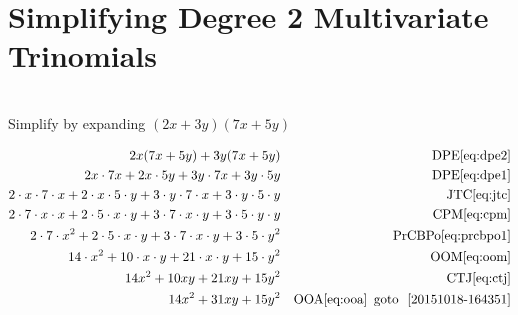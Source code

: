 \documentclass[20150903-160354-rs2.2-MarksMathNotebook.tex]{subfiles}
\begin{document}

\section{Simplifying Degree 2 Multivariate Trinomials}\label{Simplify! Degree 2 Multivariate Trinomials}

\begin{example}[id:20151018-161544] \label{20151018-161544} \hfill \\
Simplify by expanding $(2x+3y)(7x+5y)$

\soln

\solnsteps
\begin{align*}
2x(7x+5y) + 3y(7x+5y) && \text{DPE} \eqref{eq:dpe2} \\
2x \cdot 7x + 2x \cdot 5y + 3y \cdot 7x + 3y \cdot 5y && \text{DPE} \eqref{eq:dpe1} \\
2 \cdot x \cdot 7 \cdot x +  2 \cdot x \cdot 5 \cdot y + 3 \cdot y \cdot 7 \cdot x + 3 \cdot y \cdot 5 \cdot y && \text{JTC} \eqref{eq:jtc} \\
2 \cdot 7 \cdot x \cdot x +  2 \cdot 5 \cdot x \cdot y + 3 \cdot 7 \cdot x \cdot y + 3 \cdot 5 \cdot y \cdot y && \text{CPM} \eqref{eq:cpm} \\
2 \cdot 7 \cdot x^2 +  2 \cdot 5 \cdot x \cdot y + 3 \cdot 7 \cdot x \cdot y + 3 \cdot 5 \cdot y^2 && \text{PrCBPo} \eqref{eq:prcbpo1} \\
14 \cdot x^2 +  10 \cdot x \cdot y + 21 \cdot x \cdot y + 15 \cdot y^2 && \text{OOM} \eqref{eq:oom} \\
14x^2 +  10xy + 21xy + 15y^2 && \text{CTJ} \eqref{eq:ctj} \\
14x^2 +  31xy + 15y^2 && \text{OOA} \eqref{eq:ooa} \text{\, goto \,} \, \ref{20151018-164351} 
\end{align*}
\end{example}
\end{document}
